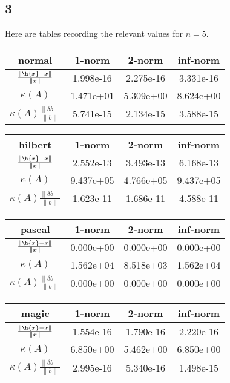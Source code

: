 \documentclass{article}
\begin{document}
\subsection*{3}
Here are tables recording the relevant values for $n=5$.


\vspace{10pt}
\begin{tabular}{c|c|c|c}
    normal&1-norm&2-norm&inf-norm\\
    \hline
        $\frac{\|\h{x}-x\|}{\|x\|}$&1.998e-16&2.275e-16&3.331e-16\\
        $\kappa(A)$&1.471e+01&5.309e+00&8.624e+00\\
        $\kappa(A)\frac{\|\delta b\|}{\|b\|}$&5.741e-15&2.134e-15&3.588e-15\\
\end{tabular}


\vspace{10pt}
\begin{tabular}{c|c|c|c}
        hilbert&1-norm&2-norm&inf-norm\\
        \hline
            $\frac{\|\h{x}-x\|}{\|x\|}$&2.552e-13&3.493e-13&6.168e-13\\
            $\kappa(A)$&9.437e+05&4.766e+05&9.437e+05\\
            $\kappa(A)\frac{\|\delta b\|}{\|b\|}$&1.623e-11&1.686e-11&4.588e-11\\
\end{tabular}


\vspace{10pt}
\begin{tabular}{c|c|c|c}
        pascal&1-norm&2-norm&inf-norm\\
        \hline
            $\frac{\|\h{x}-x\|}{\|x\|}$&0.000e+00&0.000e+00&0.000e+00\\
            $\kappa(A)$&1.562e+04&8.518e+03&1.562e+04\\
            $\kappa(A)\frac{\|\delta b\|}{\|b\|}$&0.000e+00&0.000e+00&0.000e+00\\
\end{tabular}


\vspace{10pt}
\begin{tabular}{c|c|c|c}
        magic&1-norm&2-norm&inf-norm\\
        \hline
            $\frac{\|\h{x}-x\|}{\|x\|}$&1.554e-16&1.790e-16&2.220e-16\\
            $\kappa(A)$&6.850e+00&5.462e+00&6.850e+00\\
            $\kappa(A)\frac{\|\delta b\|}{\|b\|}$&2.995e-16&5.340e-16&1.498e-15\\
\end{tabular}
\end{document}
